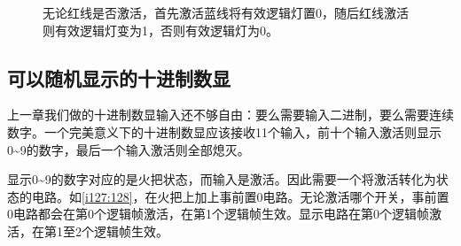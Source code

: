 \begin{figure}[!ht]
\begin{center}
\qquad
{}
\end{center}
\caption{无论红线是否激活，首先激活蓝线将有效逻辑灯置0，随后红线激活则有效逻辑灯变为1，否则有效逻辑灯为0。}
\label{i173:176}
\end{figure}

\subsection{可以随机显示的十进制数显}

上一章我们做的十进制数显输入还不够自由：要么需要输入二进制，要么需要连续数字。一个完美意义下的十进制数显应该接收11个输入，前十个输入激活则显示0\~{}9的数字，最后一个输入激活则全部熄灭。

显示0\~{}9的数字对应的是火把状态，而输入是激活。因此需要一个将激活转化为状态的电路。如\autoref{i127:128}，在火把上加上事前置0电路。无论激活哪个开关，事前置0电路都会在第0个逻辑帧激活，在第1个逻辑帧生效。显示电路在第0个逻辑帧激活，在第1至2个逻辑帧生效。

\begin{figure}[!ht]
\begin{center}
\qquad
{}
\end{center}
\caption{}
\label{i127:128}
\end{figure}

